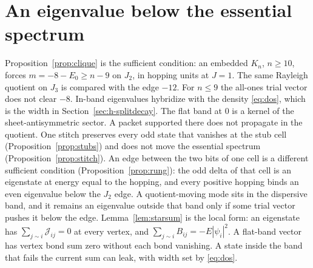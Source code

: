 \section{An eigenvalue below the essential spectrum}
\label{sec:h-matter}

Proposition~\ref{prop:clique} is the sufficient condition:
an embedded \(K_n\), \(n\ge 10\), forces
\(m=-8-E_0\ge n-9\) on \(J_2\), in hopping units at \(J=1\).
The same Rayleigh quotient on \(J_3\) is compared with the edge \(-12\).
For \(n\le 9\) the all-ones trial vector does not clear \(-8\).
In-band eigenvalues hybridize with the density \eqref{eq:dos}, which is the
width in Section~\ref{sec:h-splitdecay}.
The flat band at \(0\) is a kernel of the sheet-antisymmetric sector.
A packet supported there does not propagate in the quotient.
One stitch preserves every odd state that vanishes at the stub cell
(Proposition~\ref{prop:stubs}) and does not move the essential spectrum
(Proposition~\ref{prop:stitch}).
An edge between the two bits of one cell is a different sufficient
condition (Proposition~\ref{prop:rung}): the odd delta of that cell is an
eigenstate at energy equal to the hopping, and every positive hopping
binds an even eigenvalue below the \(J_2\) edge.
A quotient-moving mode sits in the dispersive band, and it remains an
eigenvalue outside that band only if some trial vector pushes it below the edge.
Lemma~\ref{lem:starsum} is the local form: an eigenstate has
\(\sum_{j\sim i}\mathcal{J}_{ij}=0\) at every vertex, and
\(\sum_{j\sim i}B_{ij}=-E|\psi_i|^2\).
A flat-band vector has vertex bond sum zero without each bond vanishing.
A state inside the band that fails the current sum can leak, with width
set by \eqref{eq:dos}.

